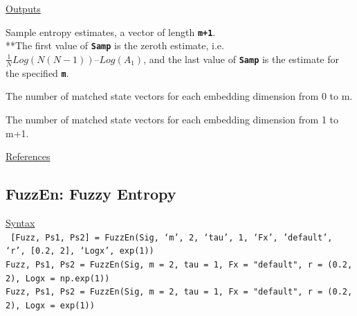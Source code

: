 \documentclass[12pt, a4paper, titlepage, openany]{book}
\begin{document}
\noindent \ul{Outputs}
\begin{description}[labelsep=1cm, labelwidth=2cm, nosep, style=multiline,leftmargin=3cm]\footnotesize
\item[\texttt{Samp}]		Sample entropy estimates, a vector of length \texttt{\textbf{m+1}}.\\
				**The first value of \texttt{\textbf{Samp}} is the zeroth estimate, i.e. $\frac{1}{N}Log(N(N-1)) – Log(A_1)$, and the last value of \texttt{\textbf{Samp}} is the estimate for the specified \textbf{\texttt{m}}.
\item[\texttt{A}]		The number of matched state vectors for each embedding dimension from 0 to m.
\item[\texttt{B}]		The number of matched state vectors for each embedding dimension from 1 to m+1.
\end{description}

\noindent \ul{References}\hspace{1cm}
\cite{Samp1}



\newpage
\subsection{\normalsize FuzzEn: \hspace{15mm}  Fuzzy Entropy}
\noindent\ul{Syntax} \vspace{6mm} \\ \noindent \texttt{\footnotesize
[Fuzz, Ps1, Ps2] = FuzzEn(Sig, ‘m’, 2, ‘tau’, 1, ‘Fx’, 'default', ‘r’, [0.2, 2], ‘Logx’, exp(1))\\
Fuzz, Ps1, Ps2   = FuzzEn(Sig, m = 2, tau = 1, Fx = "default", r = (0.2, 2), Logx = np.exp(1))\\
Fuzz, Ps1, Ps2   = FuzzEn(Sig, m = 2, tau = 1, Fx = "default", r = (0.2, 2), Logx = exp(1))}
\end{document}
